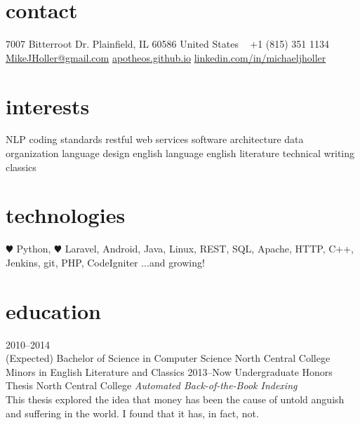 \documentclass[]{friggeri-cv} %
\begin{document}


\begin{aside} %
\section{contact}
7007 Bitterroot Dr.
Plainfield, IL 60586
United States
~
+1 (815) 351 1134
~
\href{mailto:mikejholler@gmail.com}{MikeJHoller@gmail.com}
\href{http://apotheos.github.io}{apotheos.github.io}
\href{http://www.linkedin.com/in/michaeljholler}{linkedin.com/in/michaeljholler}
\section{interests}
NLP
coding standards
restful web services
software architecture
data organization
language design
english language
english literature
technical writing
classics
\section{technologies}
{\color{red} $\varheartsuit$} Python, {\color{red} $\varheartsuit$} Laravel,
Android, Java, Linux,
REST, SQL, Apache,
HTTP, C++, Jenkins,
git, PHP, CodeIgniter
...and growing!
\end{aside}


\section{education}

\begin{entrylist}
\entry
{2010--2014 \\(Expected)}
{Bachelor of Science {\normalfont in Computer Science}}
{North Central College}
{Minors in English Literature and Classics}
\entry
{2013--Now}
{Undergraduate {\normalfont Honors Thesis}}
{North Central College}
{\emph{Automated Back-of-the-Book Indexing} \\
This thesis explored the idea that money has been the cause of untold anguish and suffering in the world. I found that it has, in fact, not.}
\end{entrylist}
\end{document}
